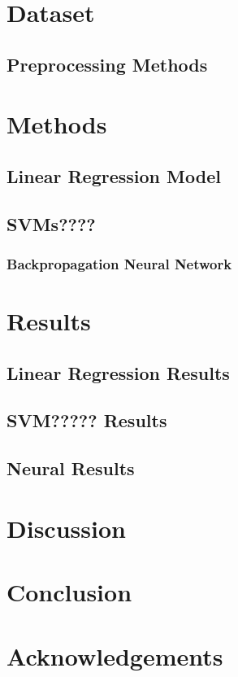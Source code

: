 \documentclass[11pt]{article}
\begin{document}
\section{Dataset}

\subsection{Preprocessing Methods}

\section{Methods}

\subsection{Linear Regression Model}

\subsection{SVMs????}

\subsubsection{Backpropagation Neural Network}

\section{Results}

\subsection{Linear Regression Results}


\subsection{SVM????? Results}


\subsection{Neural Results}


\section{Discussion}


\section{Conclusion}


\section*{Acknowledgements}







\end{document}

